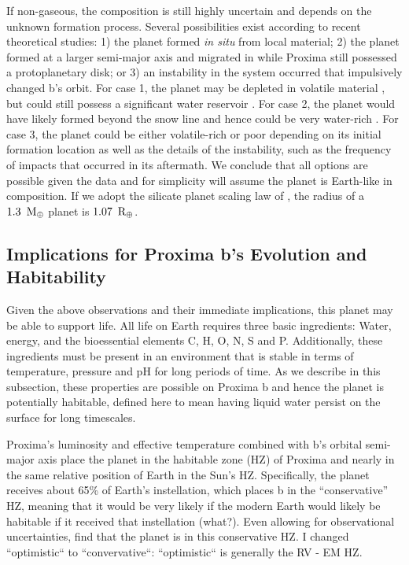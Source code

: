 \documentclass[preprint,12pt]{aastex}
\newcommand{\xxx}[1]{{\color{red} #1}} %
\newcommand{\xxx}[1]{{\color{red} #1}} %
\def\mearth{{\rm\,M_\oplus}}
\def\rearth{{\rm\,R_\oplus}}
\begin{document}
If non-gaseous, the composition is still highly uncertain and depends
on the unknown formation process. Several possibilities exist
according to recent theoretical studies: 1) the planet formed {\it in
  situ} from local material; 2) the planet formed at a larger
semi-major axis and migrated in while Proxima still possessed a
protoplanetary disk; or 3) an instability in the system occurred that
impulsively changed b's orbit. For case 1, the planet may be depleted
in volatile material \citep{Raymond07,Lissauer07}, but could still
possess \xxx{a significant water reservoir} \citep{Mulders15}. For case 2,
the planet would have likely formed beyond the snow line and hence
could be very water-rich \citep{CarterBond12}. For case 3, the planet
could be either volatile-rich or poor depending on its initial
formation location as well as the details of the instability, such as
the frequency of impacts that occurred in its aftermath. We conclude
that all options are possible given the data and for simplicity will
assume the planet is Earth-like in composition. If we adopt the
silicate planet scaling law of \cite{Sotin07}, the radius of a
$1.3~\mearth$ planet is $1.07~\rearth$.

\subsection{Implications for Proxima b's Evolution and Habitability}
\label{sec:obs:imp}

Given the above observations and their immediate implications, this
planet may be able to support life. All life on Earth requires three
basic ingredients: Water, energy, and the bioessential elements C,
H, O, N, S and P. Additionally, these ingredients must be present in an
environment that is stable in terms of temperature, pressure and pH
for long periods of time. As we describe in this subsection, these
properties are possible on Proxima b and hence the planet is
potentially habitable, defined here to mean having liquid water persist on
the surface for long timescales.

Proxima's luminosity and effective temperature combined with b's
orbital semi-major axis place the planet in the habitable zone (HZ) of
Proxima and nearly in the same relative position of Earth in the Sun's
HZ. Specifically, the planet receives about 65\% of Earth's
instellation, which places b in the ``conservative'' HZ, \xxx{meaning that it
would be very likely if the modern Earth would likely be habitable if
it received that instellation (what?)}. Even allowing for observational
uncertainties, \cite{AngladaEscude16} find that the planet is in this
conservative HZ. \xxx{I changed ``optimistic`` to ``convervative``: ``optimistic``
is generally the RV - EM HZ.}
\end{document}
